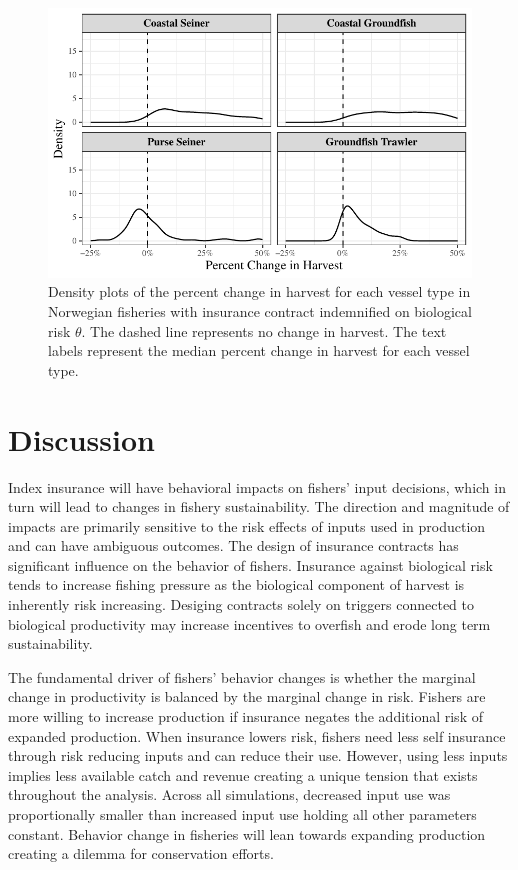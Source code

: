 \documentclass[
  letterpaper,
  DIV=11,
  numbers=noendperiod]{scrartcl}
\theoremstyle{plain}
\theoremstyle{plain}
\theoremstyle{remark}
\begin{document}
\begin{figure}

{\centering \includegraphics{ibi-behavior_files/figure-pdf/fig-asche-theta-1.pdf}

}

\caption{\label{fig-asche-theta}Density plots of the percent change in
harvest for each vessel type in Norwegian fisheries with insurance
contract indemnified on biological risk \(\theta\). The dashed line
represents no change in harvest. The text labels represent the median
percent change in harvest for each vessel type.}

\end{figure}

\hypertarget{sec-disc}{%
\section{Discussion}\label{sec-disc}}

Index insurance will have behavioral impacts on fishers' input
decisions, which in turn will lead to changes in fishery sustainability.
The direction and magnitude of impacts are primarily sensitive to the
risk effects of inputs used in production and can have ambiguous
outcomes. The design of insurance contracts has significant influence on
the behavior of fishers. Insurance against biological risk tends to
increase fishing pressure as the biological component of harvest is
inherently risk increasing. Desiging contracts solely on triggers
connected to biological productivity may increase incentives to overfish
and erode long term sustainability.

The fundamental driver of fishers' behavior changes is whether the
marginal change in productivity is balanced by the marginal change in
risk. Fishers are more willing to increase production if insurance
negates the additional risk of expanded production. When insurance
lowers risk, fishers need less self insurance through risk reducing
inputs and can reduce their use. However, using less inputs implies less
available catch and revenue creating a unique tension that exists
throughout the analysis. Across all simulations, decreased input use was
proportionally smaller than increased input use holding all other
parameters constant. Behavior change in fisheries will lean towards
expanding production creating a dilemma for conservation efforts.
\end{document}
